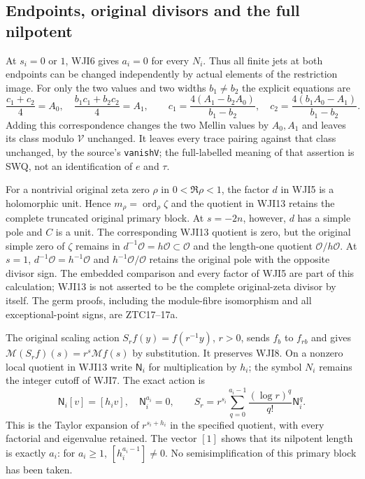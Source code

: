 \documentclass[11pt]{article}
\begin{document}
\subsection{Endpoints, original divisors and the full nilpotent}

At $s_i=0$ or $1$, WJI6 gives $a_i=0$ for every $N_i$.
Thus all finite jets at both endpoints can be changed
independently by actual elements of the restriction image.
For only the two values and two widths $b_1\ne b_2$ the
explicit equations are
\begin{equation}\tag{WJI14}
 \frac{c_1+c_2}{4}=A_0,\quad
 \frac{b_1c_1+b_2c_2}{4}=A_1,\qquad
 c_1=\frac{4(A_1-b_2A_0)}{b_1-b_2},\quad
 c_2=\frac{4(b_1A_0-A_1)}{b_1-b_2}.
\end{equation}
Adding this correspondence changes the two Mellin values by
$A_0,A_1$ and leaves its class modulo $\mathcal V$ unchanged.
It leaves every trace pairing against that class unchanged,
by the source's \texttt{vanishV}; the full-labelled meaning
of that assertion is SWQ, not an identification of $e$ and $\tau$.

For a nontrivial original zeta zero $\rho$ in $0<\Re\rho<1$,
the factor $d$ in WJI5 is a holomorphic unit. Hence
$m_\rho=\operatorname{ord}_\rho\zeta$ and the quotient
in WJI13 retains the complete truncated original primary block.
At $s=-2n$, however, $d$ has a simple pole and $C$ is a unit.
The corresponding WJI13 quotient is zero, but the original
simple zero of $\zeta$ remains in
$d^{-1}\mathcal O=h\mathcal O\subset\mathcal O$ and the
length-one quotient $\mathcal O/h\mathcal O$.
At $s=1$, $d^{-1}\mathcal O=h^{-1}\mathcal O$ and
$h^{-1}\mathcal O/\mathcal O$ retains the original pole with
the opposite divisor sign. The embedded comparison and every
factor of WJI5 are part of this calculation; WJI13 is not
asserted to be the complete original-zeta divisor by itself.
The germ proofs, including the module-fibre isomorphism and
all exceptional-point signs, are ZTC17--17a.

The original scaling action $S_r f(y)=f(r^{-1}y)$,
$r>0$, sends $f_b$ to $f_{rb}$ and gives
$\mathcal M(S_rf)(s)=r^s\mathcal Mf(s)$ by substitution.
It preserves WJI8. On a nonzero local quotient in WJI13
write $\mathsf N_i$ for multiplication by $h_i$;
the symbol $N_i$ remains the integer cutoff of WJI7.
The exact action is
\begin{equation}\tag{WJI15}
 \mathsf N_i[v]=[h_iv],\quad
 \mathsf N_i^{a_i}=0,\qquad
 S_r=r^{s_i}\sum_{q=0}^{a_i-1}
                   \frac{(\log r)^q}{q!}\mathsf N_i^q.
\end{equation}
This is the Taylor expansion of $r^{s_i+h_i}$ in the
specified quotient, with every factorial and eigenvalue
retained. The vector $[1]$ shows that its nilpotent length
is exactly $a_i$: for $a_i\ge1$, $[h_i^{a_i-1}]\ne0$.
No semisimplification of this primary block has been taken.
\end{document}
